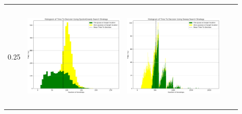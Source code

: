 \begin{landscape}
\begin{table}[h!]
\begin{tabular}{ | c | c | c | c | c |}
    0.25 &
    \begin{minipage}[c][58mm][c]{48mm}
      \includegraphics[width=48mm, height=52mm]{Chapters/MultiAgentTargetDetection/Figs/Histograms/VaryingInitBelief/25/25EpsilonGreedyHistogram.png}
    \end{minipage}
    &
    \begin{minipage}[c][58mm][c]{48mm}
      \includegraphics[width=48mm, height=52mm]{Chapters/MultiAgentTargetDetection/Figs/Histograms/VaryingInitBelief/25/25SweepHistogram.png}


\end{minipage}
\end{tabular}
\end{table}
\end{landscape}
